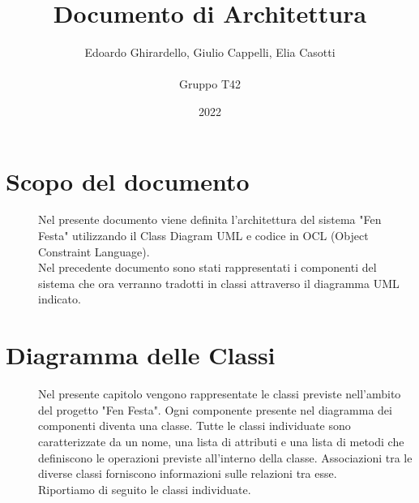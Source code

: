 \documentclass{article}
\title{\textbf{\Huge Documento di Architettura}}
\author{Edoardo Ghirardello, Giulio Cappelli, Elia Casotti \\ \\ Gruppo T42}
\date{2022}
\begin{document}
\maketitle

\clearpage
\tableofcontents
\clearpage

\section{Scopo del documento}
\begin{description}
    \item[] Nel presente documento viene definita l'architettura del sistema "Fen Festa" utilizzando il Class Diagram UML e codice in OCL (Object Constraint Language). \\
        Nel precedente documento sono stati rappresentati i componenti del sistema che ora verranno tradotti in classi attraverso il diagramma UML indicato.
\end{description}
\clearpage
\section{Diagramma delle Classi}
\begin{description}
    \item[] Nel presente capitolo vengono rappresentate le classi previste nell'ambito del progetto "Fen Festa". Ogni componente presente nel diagramma dei componenti diventa una classe. Tutte le classi individuate sono caratterizzate da un nome, una lista di attributi e una lista di metodi che definiscono le operazioni previste all’interno della classe. Associazioni tra le diverse classi forniscono informazioni sulle relazioni tra esse. \\
        Riportiamo di seguito le classi individuate.
\end{description}
\end{document}
